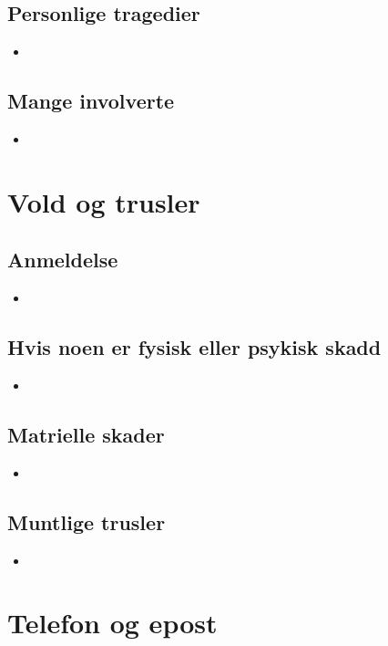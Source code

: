 \documentclass[12pt,a4paper]{memoir}
\begin{document}
	\section{Personlige tragedier}
		\begin{itemize}
			\item
		\end{itemize}
	\section{Mange involverte}
		\begin{itemize}
			\item
		\end{itemize}

\newpage
\chapter{Vold og trusler}
	\section{Anmeldelse}
		\begin{itemize}
			\item
		\end{itemize}
	\section{Hvis noen er fysisk eller psykisk skadd}
		\begin{itemize}
			\item
		\end{itemize}
	\section{Matrielle skader} 
		\begin{itemize}
			\item
		\end{itemize}
	\section{Muntlige trusler}
		\begin{itemize}
			\item
		\end{itemize}

\newpage
\chapter{Telefon og epost}
		
\end{document}
